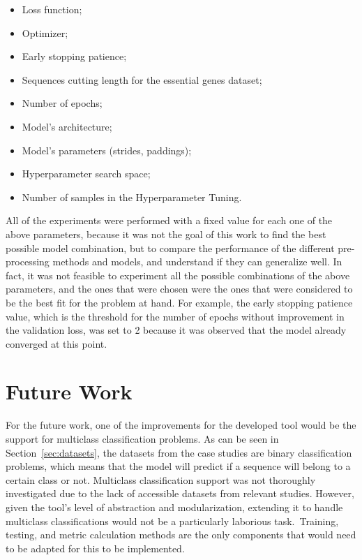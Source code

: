 \begin{itemize}
    \item Loss function;
    \item Optimizer;
    \item Early stopping patience;
    \item Sequences cutting length for the essential genes dataset;
    \item Number of epochs;
    \item Model's architecture;
    \item Model's parameters (strides, paddings);
    \item Hyperparameter search space;
    \item Number of samples in the Hyperparameter Tuning.
\end{itemize}

All of the experiments were performed with a fixed value for each one of the above parameters, because it was not the goal of this work to find the best possible model combination, but to compare the performance of the different pre-processing methods and models, and understand if they can generalize well. In fact, it was not feasible to experiment all the possible combinations of the above parameters, and the ones that were chosen were the ones that were considered to be the best fit for the problem at hand. For example, the early stopping patience value, which is the threshold for the number of epochs without improvement in the validation loss, was set to 2 because it was observed that the model already converged at this point. %

\section{Future Work}

For the future work, one of the improvements for the developed tool would be the support for multiclass classification problems. As can be seen in Section~\ref{sec:datasets}, the datasets from the case studies are binary classification problems, which means that the model will predict if a sequence will belong to a certain class or not. Multiclass classification support was not thoroughly investigated due to the lack of accessible datasets from relevant studies. However, given the tool's level of abstraction and modularization, extending it to handle multiclass classifications would not be a particularly laborious task. Training, testing, and metric calculation methods are the only components that would need to be adapted for this to be implemented.

